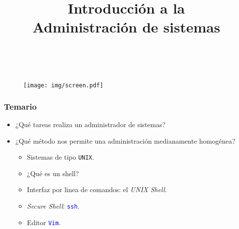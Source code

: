 \documentclass[11pt,a4paper,spanish]{beamer}
\title{\textbf{Introducción a la\\
Administración de sistemas}}
\author{}
\date{}
\newcommand{\codeword}[1]{\mbox{\texttt{\textcolor{blue}{#1}}}}
\begin{document}
\begin{frame}[noframenumbering]

    \maketitle
    \centering
    \vspace{-8em}~
    \begin{figure}
    \texttt{[image: img/screen.pdf]}
    \end{figure}

\end{frame}

\begin{frame}

    \frametitle{Temario}

\begin{itemize}

    \item ¿Qué tareas realiza un administrador de sistemas?
    \item ¿Qué método nos permite una administración medianamente homogénea?
        \begin{itemize}
            \item Sistemas de tipo \texttt{UNIX}.
            \item ¿Qué es un shell?
            \item Interfaz por linea de comandos: el \emph{UNIX Shell}.
            \item \emph{Secure Shell}: \codeword{ssh}.
            \item Editor \codeword{Vim}.
        \end{itemize}

\end{itemize}

\end{frame}
\end{document}
